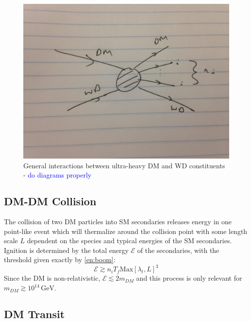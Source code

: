 \documentclass[twocolumn,showpacs,preprintnumbers,amsmath,amssymb,prd]{revtex4}
\newcommand{\GeV}{\text{GeV}}
\begin{document}
\begin{figure}
\label{feynman}
\includegraphics[scale=.05]{feynmandiag}
\caption{General interactions between ultra-heavy DM and WD constituents - \textcolor{blue}{do diagrams properly}}
\end{figure}

\subsection{DM-DM Collision}

The collision of two DM particles into SM secondaries releases energy in one point-like event which will thermalize around the collision point with some length scale $L$ dependent on the species and typical energies of the SM secondaries.  Ignition is determined by the total energy $\mathcal{E}$ of the secondaries, with the threshold given exactly by \eqref{en:boom}:
\[
    \mathcal{E} \gtrsim n_i T_f \text{Max}\left[\lambda_t, L\right]^3
\]
Since the DM is non-relativistic, $\mathcal{E} \lesssim 2 m_{DM}$ and this process is only relevant for $m_{DM} \gtrsim 10^{14} \, \GeV$.


\subsection{DM Transit}
\end{document}
